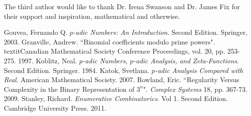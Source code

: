 \documentclass[12pt, letter]{article}    %
\theoremstyle{plain}
\theoremstyle{definition}
\numberwithin{equation}{section}
\begin{document}
The third author would like to thank Dr. Irena Swanson and Dr. James Fix for their support and inspiration, mathematical and otherwise.


\begin{thebibliography}{aaaa} 
 Gouvea, Fernando Q.
\textit{$p$-adic Numbers: An Introduction}. Second Edition.
Springer, 2003.
 Granville, Andrew.
``Binomial coefficients modulo prime powers". textit{Canadian Mathematical Society Conference Proceedings}, vol. 20, pp. 253-275. 1997.
 Koblitz, Neal.
\textit{$p$-adic Numbers, $p$-adic Analysis, and Zeta-Functions}. Second Edition. Springer. 1984.
 Katok, Svetlana.
\textit{$p$-adic Analysis Compared with Real}. American Mathematical Society. 2007.
 Rowland, Eric.
``Regularity Versus Complexity in the Binary Representation of $3^n$". \textit{Complex Systems} 18, pp. 367-73. 2009. 
 Stanley, Richard.
\textit{Enumerative Combinatorics}. Vol 1. Second Edition. Cambridge University Press. 2011.
\end{thebibliography}


\end{document}
